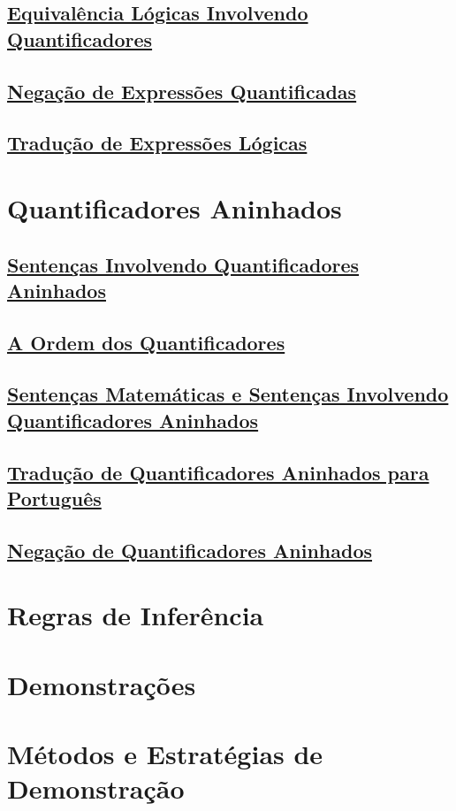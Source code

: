 \subsection*{\underline{Equivalência Lógicas Involvendo Quantificadores}}
\subsection*{\underline{Negação de Expressões Quantificadas}}
\subsection*{\underline{Tradução de Expressões Lógicas}}

\section{Quantificadores Aninhados}

\subsection*{\underline{Sentenças Involvendo Quantificadores Aninhados}}
\subsection*{\underline{A Ordem dos Quantificadores}}
\subsection*{\underline{Sentenças Matemáticas e Sentenças Involvendo Quantificadores
Aninhados}}
\subsection*{\underline{Tradução de Quantificadores Aninhados para Português}}
\subsection*{\underline{Negação de Quantificadores Aninhados}}

\section{Regras de Inferência}
\section{Demonstrações}
\section{Métodos e Estratégias de Demonstração}